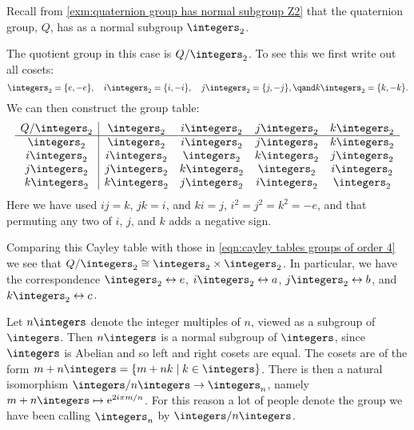 \begin{exm}{}{}
    Recall from \cref{exm:quaternion group has normal subgroup Z2} that the quaternion group, \(Q\), has as a normal subgroup \(\integers_2\).
    
    The quotient group in this case is \(Q/\integers_2\).
    To see this we first write out all cosets:
    \begin{equation*}
        \integers_2 = \{e, -e\}, \quad i\integers_2 = \{i, -i\}, \quad j\integers_2 = \{j, -j\}, \qand k\integers_2 = \{k, -k\}.
    \end{equation*}
    We can then construct the group table:
    \begin{equation}
        \begin{array}{c|cccc}
            Q/\integers_2 & \integers_2  & i\integers_2 & j\integers_2 & k\integers_2\\ \hline
            \integers_2   & \integers_2  & i\integers_2 & j\integers_2 & k\integers_2\\
            i\integers_2  & i\integers_2 & \integers_2  & k\integers_2 & j\integers_2\\
            j\integers_2  & j\integers_2 & k\integers_2 & \integers_2  & i\integers_2\\
            k\integers_2  & k\integers_2 & j\integers_2 & i\integers_2 & \integers_2
        \end{array}
    \end{equation}
    Here we have used \(ij = k\), \(jk = i\), and \(ki = j\), \(i^2 = j^2 = k^2 = -e\), and that permuting any two of \(i\), \(j\), and \(k\) adds a negative sign.
    
    Comparing this Cayley table with those in \cref{eqn:cayley tables groups of order 4} we see that \(Q/\integers_2 \isomorphic \integers_2 \times \integers_2\).
    In particular, we have the correspondence \(\integers_2 \leftrightarrow e\), \(i\integers_2 \leftrightarrow a\), \(j\integers_2 \leftrightarrow b\), and \(k\integers_2 \leftrightarrow c\).
\end{exm}

\begin{exm}{}{}
    Let \(n\integers\) denote the integer multiples of \(n\), viewed as a subgroup of \(\integers\).
    Then \(n\integers\) is a normal subgroup of \(\integers\), since \(\integers\) is Abelian and so left and right cosets are equal.
    The cosets are of the form \(m + n\integers = \{m + nk \mid k \in \integers\}\).
    There is then a natural isomorphism \(\integers/n\integers \to \integers_n\), namely \(m + n\integers \mapsto \e^{2i\pi m/n}\).
    For this reason a lot of people denote the group we have been calling \(\integers_n\) by \(\integers/n\integers\).
\end{exm}

